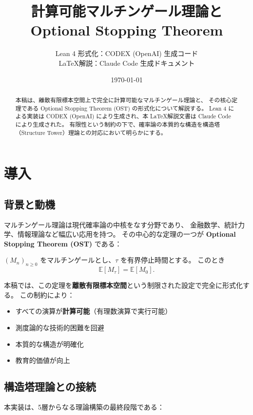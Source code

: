\documentclass[a4paper,12pt]{ltjsarticle}
\title{計算可能マルチンゲール理論と\\Optional Stopping Theorem}
\author{%
  Lean 4 形式化：CODEX (OpenAI) 生成コード\\[0.5em]
  \LaTeX 解説：Claude Code 生成ドキュメント%
}
\date{\today}
\theoremstyle{definition}
\begin{document}
\maketitle

\begin{abstract}
本稿は、離散有限標本空間上で完全に計算可能なマルチンゲール理論と、
その核心定理である Optional Stopping Theorem (OST) の形式化について解説する。
Lean 4 による実装は CODEX (OpenAI) により生成され、本 \LaTeX 解説文書は Claude Code により生成された。
有限性という制約の下で、確率論の本質的な構造を構造塔（Structure Tower）理論との対応において明らかにする。
\end{abstract}

\tableofcontents

\section{導入}

\subsection{背景と動機}

マルチンゲール理論は現代確率論の中核をなす分野であり、
金融数学、統計力学、情報理論など幅広い応用を持つ。
その中心的な定理の一つが \textbf{Optional Stopping Theorem (OST)} である：

\begin{maintheorem}
$(M_n)_{n \geq 0}$ をマルチンゲールとし、$\tau$ を有界停止時間とする。
このとき
\[
  \mathbb{E}[M_\tau] = \mathbb{E}[M_0].
\]
\end{maintheorem}

本稿では、この定理を\textbf{離散有限標本空間}という制限された設定で完全に形式化する。
この制約により：
\begin{itemize}
  \item すべての演算が\textbf{計算可能}（有理数演算で実行可能）
  \item 測度論的な技術的困難を回避
  \item 本質的な構造が明確化
  \item 教育的価値が向上
\end{itemize}

\subsection{構造塔理論との接続}

本実装は、5層からなる理論構築の最終段階である：
\end{document}
